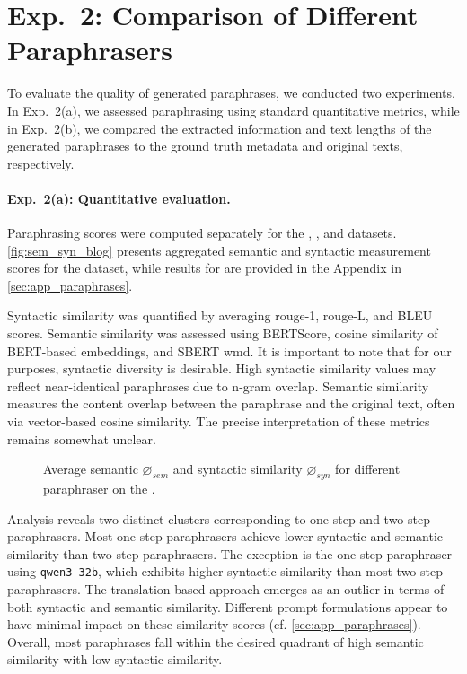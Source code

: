 \section{Exp.\ 2: Comparison of Different Paraphrasers}
\label{sec:comp_paraphrases}

To evaluate the quality of generated paraphrases, we conducted two experiments. 
In Exp.\ 2(a), we assessed paraphrasing using standard quantitative metrics, while in Exp.\ 2(b), we compared the extracted information and text lengths of the generated paraphrases to the ground truth metadata and original texts, respectively.

\paragraph{Exp.\ 2(a): Quantitative evaluation.}

Paraphrasing scores were computed separately for the \dataBlog{}, \dataGutenberg{}, and \dataStudent{} datasets. 
\autoref{fig:sem_syn_blog} presents aggregated semantic and syntactic measurement scores for the \dataBlog{} dataset, while results for \dataGutenberg{} are provided in the Appendix in \autoref{sec:app_paraphrases}.

Syntactic similarity was quantified by averaging \ac{rouge}-1, \ac{rouge}-L, and BLEU scores. 
Semantic similarity was assessed using BERTScore, cosine similarity of BERT-based embeddings, and SBERT \ac{wmd}. 
It is important to note that for our purposes, syntactic diversity is desirable.
High syntactic similarity values may reflect near-identical paraphrases due to n-gram overlap. 
Semantic similarity measures the content overlap between the paraphrase and the original text, often via vector-based cosine similarity. 
The precise interpretation of these metrics remains somewhat unclear.

\begin{figure}[htbp]
    \centering
    
    \caption[Comparison of paraphrasers on the \dataBlog{} dataset.]{Average semantic $\diameter_{sem}$ and syntactic similarity $\diameter_{syn}$ for different paraphraser on the \dataBlog{}.}
    \label{fig:sem_syn_blog}
\end{figure}


Analysis reveals two distinct clusters corresponding to one-step and two-step paraphrasers. 
Most one-step paraphrasers achieve lower syntactic and semantic similarity than two-step paraphrasers. 
The exception is the one-step paraphraser using \texttt{qwen3-32b}, which exhibits higher syntactic similarity than most two-step paraphrasers. 
The translation-based approach emerges as an outlier in terms of both syntactic and semantic similarity. 
Different prompt formulations appear to have minimal impact on these similarity scores (cf. \autoref{sec:app_paraphrases}). 
Overall, most paraphrases fall within the desired quadrant of high semantic similarity with low syntactic similarity.


